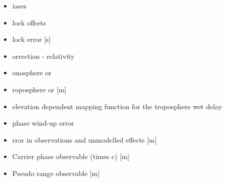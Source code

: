 \begin{itemize}
	\item {\LARGE{\boldmath{$\beta$}}}iases
	\item {\LARGE{\boldmath{$\zeta$}}}lock offsets
	\item {\LARGE{}}lock error [s]
	\item {\LARGE{\boldmath{$\kappa$}}}orrection - relativity
	\item {\LARGE{\boldmath{$\iota$}}}onosphere or  {\LARGE{}}
	\item {\LARGE{\boldmath{$\tau$}}}roposphere or {\LARGE{}} [m]
	\item {\LARGE{}} elevation dependent mapping function for the troposphere wet delay
	\item {\LARGE{\boldmath{$\xi$}}} phase wind-up error
	\item {\LARGE{\boldmath{$\epsilon$}}}rror in observations and unmodelled effects [m]
	\item {\LARGE{}} Carrier phase observable (times c) [m]
	\item {\LARGE{}}Pseudo range observable [m]
		
\end{itemize}


